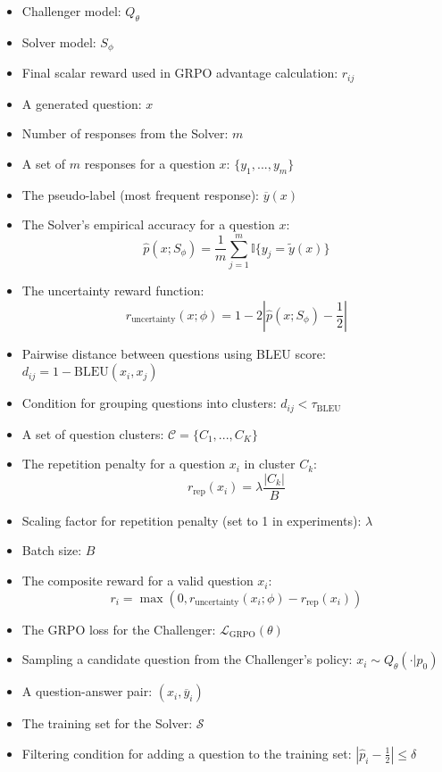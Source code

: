 \documentclass{article}
\begin{document}
\begin{itemize}
    \item Challenger model: $Q_{\theta}$
    \item Solver model: $S_{\phi}$
    \item Final scalar reward used in GRPO advantage calculation: $r_{ij}$
    \item A generated question: $x$
    \item Number of responses from the Solver: $m$
    \item A set of $m$ responses for a question $x$: $\{y_{1},...,y_{m}\}$
    \item The pseudo-label (most frequent response): $\overline{y}(x)$
    \item The Solver's empirical accuracy for a question $x$:
        $$\hat{p}(x;S_{\phi})=\frac{1}{m}\sum_{j=1}^{m}\mathbb{I}\{y_{j}=\tilde{y}(x)\}$$
    \item The uncertainty reward function:
        $$r_{\text{uncertainty}}(x;\phi)=1-2|\hat{p}(x;S_{\phi})-\frac{1}{2}|$$
    \item Pairwise distance between questions using BLEU score: $d_{ij}=1-\text{BLEU}(x_{i},x_{j})$
    \item Condition for grouping questions into clusters: $d_{ij}<\tau_{\text{BLEU}}$
    \item A set of question clusters: $\mathcal{C}=\{C_{1},...,C_{K}\}$
    \item The repetition penalty for a question $x_i$ in cluster $C_k$:
        $$r_{\text{rep}}(x_i) = \lambda \frac{|C_k|}{B}$$
    \item Scaling factor for repetition penalty (set to 1 in experiments): $\lambda$
    \item Batch size: $B$
    \item The composite reward for a valid question $x_i$:
        $$r_{i}=\max(0,r_{\text{uncertainty}}(x_{i};\phi)-r_{\text{rep}}(x_{i}))$$
    \item The GRPO loss for the Challenger: $\mathcal{L}_{\text{GRPO}}(\theta)$
    \item Sampling a candidate question from the Challenger's policy: $x_{i}\sim Q_{\theta}(\cdot|p_{0})$
    \item A question-answer pair: $(x_{i},\overline{y}_{i})$
    \item The training set for the Solver: $\mathcal{S}$
    \item Filtering condition for adding a question to the training set: $|\hat{p}_{i}-\frac{1}{2}|\le\delta$

\end{itemize}
\end{document}
